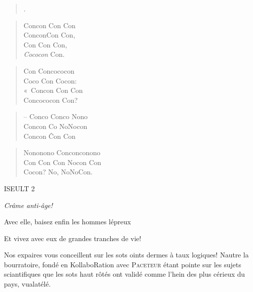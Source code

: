   \begin{verse}
    {\Huge .}
  \end{verse}
  \begin{verse}
    Concon Con Con\\
    ConconCon Con,\\
    Con Con Con,\\
    \emph{Cococon} Con.
  \end{verse}
  \begin{verse}
    Con Concococon\\
    Coco Con Cocon:\\
    «~Concon Con Con\\
    Concococon Con?
  \end{verse}
  \begin{verse}
    -- Conco Conco Nono\\
    Concon Co NoNocon\\
    Concon \^{Con} Con
  \end{verse}
  \begin{verse}
    Nononono Conconconono\\
    Con Con Con Nocon Con\\
    Cocon? No, NoNoCon.
  \end{verse}
  \begin{verse}
    {\Huge {}}
  \end{verse}

  \begin{center}
    {\Large \textsc{ISEULT 2}}

    \textit{Crâme anti-âge!}

    Avec elle, baisez enfin les hommes lépreux

    Et vivez avec eux de grandes tranches de vie!
  \end{center}
  Nos expaires vous conceillent sur les sots oints dermes à taux logiques! Nautre la bourratoire,
  fondé en KollaboRation avec \textsc{Paceteur} étant pointe sur les sujets sciantifiques que les sots
  haut rôtés ont validé comme l’hein des plus cérieux du pays, vualatélé.

